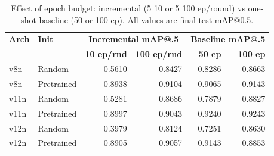 \begin{table}[t]
\caption{Effect of epoch budget: incremental (5\,\texttimes\,10 or 5\,\texttimes\,100 ep/round) vs one-shot baseline (50 or 100 ep). All values are final test mAP@0.5.}
\label{tab:epoch_budget}
\centering
\begin{tabular}{l l r r r r}
\toprule
\textbf{Arch} & \textbf{Init} & \multicolumn{2}{c}{\textbf{Incremental mAP@.5}} & \multicolumn{2}{c}{\textbf{Baseline mAP@.5}} \\
 &  & \textbf{10 ep/rnd} & \textbf{100 ep/rnd} & \textbf{50 ep} & \textbf{100 ep} \\
\midrule
v8n & Random & 0.5610 & 0.8427 & 0.8286 & 0.8663 \\
v8n & Pretrained & 0.8938 & 0.9104 & 0.9065 & 0.9143 \\
\midrule
v11n & Random & 0.5281 & 0.8686 & 0.7879 & 0.8827 \\
v11n & Pretrained & 0.8997 & 0.9043 & 0.9240 & 0.9243 \\
\midrule
v12n & Random & 0.3979 & 0.8124 & 0.7251 & 0.8630 \\
v12n & Pretrained & 0.8905 & 0.9057 & 0.9143 & 0.8853 \\
\bottomrule
\end{tabular}
\end{table}




